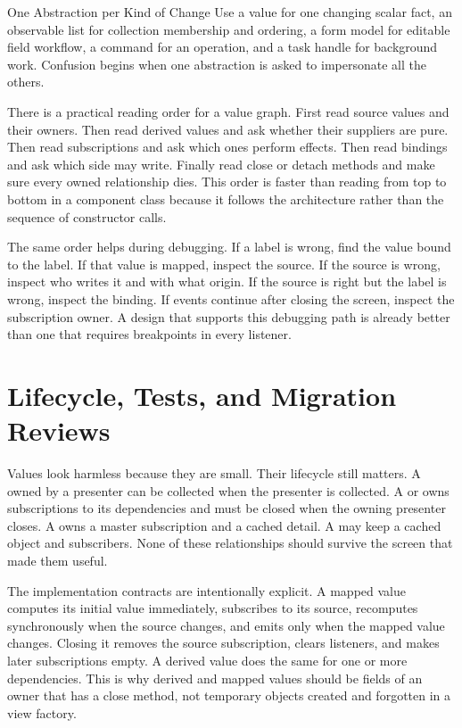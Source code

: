 \begin{principlebox}{One Abstraction per Kind of Change}
Use a value for one changing scalar fact, an observable list for collection
membership and ordering, a form model for editable field workflow, a command for
an operation, and a task handle for background work. Confusion begins when one
abstraction is asked to impersonate all the others.
\end{principlebox}

There is a practical reading order for a value graph. First read source values
and their owners. Then read derived values and ask whether their suppliers are
pure. Then read subscriptions and ask which ones perform effects. Then read
bindings and ask which side may write. Finally read close or detach methods and
make sure every owned relationship dies. This order is faster than reading from
top to bottom in a component class because it follows the architecture rather
than the sequence of constructor calls.

The same order helps during debugging. If a label is wrong, find the value bound
to the label. If that value is mapped, inspect the source. If the source is
wrong, inspect who writes it and with what origin. If the source is right but
the label is wrong, inspect the binding. If events continue after closing the
screen, inspect the subscription owner. A design that supports this debugging
path is already better than one that requires breakpoints in every listener.

\section{Lifecycle, Tests, and Migration Reviews}

Values look harmless because they are small. Their lifecycle still matters. A
 owned by a presenter can be collected when the presenter is
collected. A  or  owns subscriptions to its
dependencies and must be closed when the owning presenter closes. A
 owns a master subscription and a cached detail. A
 may keep a cached object and subscribers. None of these
relationships should survive the screen that made them useful.

The implementation contracts are intentionally explicit. A mapped value computes
its initial value immediately, subscribes to its source, recomputes
synchronously when the source changes, and emits only when the mapped value
changes. Closing it removes the source subscription, clears listeners, and makes
later subscriptions empty. A derived value does the same for one or more
dependencies. This is why derived and mapped values should be fields of an owner
that has a close method, not temporary objects created and forgotten in a view
factory.

